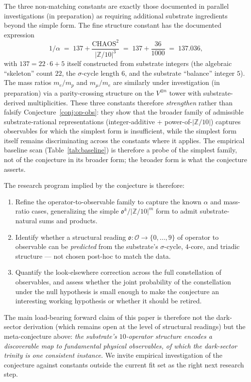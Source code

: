 \documentclass[11pt,reqno]{amsart}
\theoremstyle{plain}
\theoremstyle{definition}
\theoremstyle{remark}
\newcommand{\Z}{\mathbb{Z}}
\begin{document}
The three non-matching constants are exactly those documented in
parallel investigations (in preparation) as requiring additional
substrate ingredients beyond the simple form. The fine structure
constant has the documented expression
\[
  1/\alpha
  \;=\; 137 + \frac{\mathrm{CHAOS}^{2}}{|\Z/10|^{3}}
  \;=\; 137 + \frac{36}{1000}
  \;=\; 137.036,
\]
with $137 = 22 \cdot 6 + 5$ itself constructed from substrate
integers (the algebraic ``skeleton'' count $22$, the
$\sigma$-cycle length $6$, and the substrate ``balance''
integer $5$). The mass ratios $m_e/m_p$ and $m_\mu/m_e$ are
similarly under investigation (in preparation) via a parity-crossing
structure on the $V^{\otimes n}$ tower with substrate-derived
multiplicities.
These three constants therefore \emph{strengthen} rather than
falsify Conjecture~\ref{conj:op-obs}: they show that the broader
family of admissible substrate-rational representations
(integer-additive + power-of-$|\Z/10|$) captures observables for
which the simplest form is insufficient, while the simplest form
itself remains discriminating across the constants where it
applies. The empirical baseline scan
(Table~\ref{tab:baseline}) is therefore a probe of the simplest
family, not of the conjecture in its broader form; the broader
form is what the conjecture asserts.

The research program implied by the conjecture is therefore:
\begin{enumerate}
\item Refine the operator-to-observable family to capture the
known $\alpha$ and mass-ratio cases, generalizing the simple
$\mathfrak{o}^{k}/|\Z/10|^{m}$ form to admit
substrate-natural sums and products.
\item Identify whether a structural reading
$\mathfrak{o}: \mathcal{O} \to \{0, \dots, 9\}$ of operator
to observable can be \emph{predicted} from the substrate's
$\sigma$-cycle, $4$-core, and triadic structure --- not chosen
post-hoc to match the data.
\item Quantify the look-elsewhere correction across the full
constellation of observables, and assess whether the joint
probability of the constellation under the null hypothesis is
small enough to make the conjecture an interesting working
hypothesis or whether it should be retired.
\end{enumerate}

The main load-bearing forward claim of this paper is therefore
not the dark-sector derivation (which remains open at the level
of structural readings) but the meta-conjecture above:
\emph{the substrate's $10$-operator structure encodes a
discoverable map to fundamental physical observables, of which
the dark-sector trinity is one consistent instance.}
We invite empirical investigation of the conjecture against
constants outside the current fit set as the right next research
step.
\end{document}

